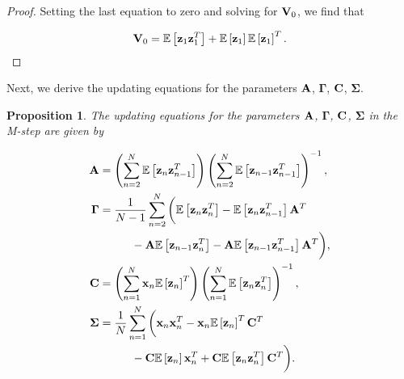 \documentclass[11pt]{article}
\numberwithin{equation}{section}
\newcommand{\expectation}[1]{\mathbb{E}\left[#1\right]}
\newcommand{\x}{{\bf x}}
\newcommand{\z}{{\bf z}}
\newtheorem{proposition}{Proposition}[section]
\begin{document}
\begin{proof}
Setting the last equation to zero and solving for ${\bf V}_0$, we find that

\begin{equation}
	{\bf V}_0 = \expectation{\z_1 \z_1^T} + \expectation{\z_1}\expectation{\z_1}^T.
\end{equation}
\end{proof}

Next, we derive the updating equations for the parameters $\bf A$, $\boldsymbol{\Gamma}$, $\bf C$, $\boldsymbol{\Sigma}$.

\begin{proposition}
	The updating equations for the parameters $\bf A$, $\boldsymbol{\Gamma}$, $\bf C$, $\boldsymbol{\Sigma}$ in the M-step are given by
	
	\begin{align}
		{\bf A} &= \left(\sum_{n=2}^N \expectation{\z_n \z_{n-1}^T}\right)\left(\sum_{n=2}^N \expectation{\z_{n-1}\z_{n-1}^T}\right)^{-1} \label{eq:mstep-A},\\
		\boldsymbol{\Gamma} &= \frac{1}{N-1}\sum_{n=2}^N\bigg( \expectation{\z_n \z_n^T} - \expectation{\z_n \z_{n-1}^T}{\bf A}^T \nonumber\\
		&\hspace{1cm} - {\bf A}\expectation{\z_{n-1}\z_n^T} - {\bf A}\expectation{\z_{n-1} \z_{n-1}^T}{\bf A}^T \bigg), \label{eq:mstep-Gamma}\\
		{\bf C} &= \left(\sum_{n=1}^N \x_n \expectation{\z_n}^T \right)\left(\sum_{n=1}^N \expectation{\z_n \z_n^T} \right)^{-1}, \label{eq:mstep-C}\\
		\boldsymbol{\Sigma} &= \frac{1}{N}\sum_{n=1}^N\bigg(\x_n\x_n^T - \x_n \expectation{\z_n}^T {\bf C}^T \nonumber\\
		&\hspace{1cm} - {\bf C}\expectation{\z_n}\x_n^T + {\bf C} \expectation{\z_n \z_n^T}{\bf C}^T \bigg). \label{eq:mstep-Sigma}
	\end{align}
\end{proposition}
\end{document}
